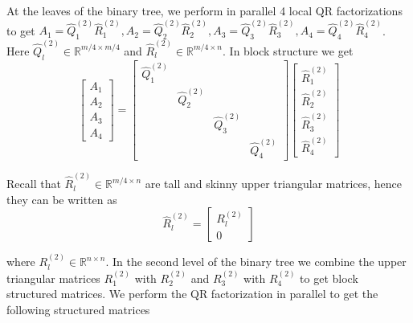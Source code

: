 \documentclass[a4paper, 12pt,oneside]{article}
\begin{document}
		At the leaves of the binary tree, we perform in parallel 4 local QR factorizations to get $A_1=\hat{Q}_1^{(2)} \hat{R}_1^{(2)}, A_2=\hat{Q}_2^{(2)} \hat{R}_2^{(2)}, A_3=\hat{Q}_3^{(2)} \hat{R}_3^{(2)}, A_4=\hat{Q}_4^{(2)} \hat{R}_4^{(2)}$. Here $\hat{Q}_l^{(2)} \in \mathbb{R}^{m / 4 \times m / 4}$ and $\hat{R}_l^{(2)} \in \mathbb{R}^{m / 4 \times n}$. In block structure we get
		$$
		\left[\begin{array}{l}
		A_1 \\
		A_2 \\
		A_3 \\
		A_4
		\end{array}\right]=\left[\begin{array}{llll}
		\hat{Q}_1^{(2)} & & & \\
		& \hat{Q}_2^{(2)} & & \\
		& & \hat{Q}_3^{(2)} & \\
		& & & \hat{Q}_4^{(2)}
		\end{array}\right]\left[\begin{array}{l}
		\hat{R}_1^{(2)} \\
		\hat{R}_2^{(2)} \\
		\hat{R}_3^{(2)} \\
		\hat{R}_4^{(2)}
		\end{array}\right]
		$$

		Recall that $\hat{R}_l^{(2)} \in \mathbb{R}^{m / 4 \times n}$ are tall and skinny upper triangular matrices, hence they can be written as
		$$
		\hat{R}_l^{(2)}=\left[\begin{array}{c}
		R_l^{(2)} \\
		0
		\end{array}\right]
		$$

		where $R_l^{(2)} \in \mathbb{R}^{n \times n}$. In the second level of the binary tree we combine the upper triangular matrices $R_1^{(2)}$ with $R_2^{(2)}$ and $R_3^{(2)}$ with $R_4^{(2)}$ to get block structured matrices. We perform the QR factorization in parallel to get the following structured matrices
\end{document}
